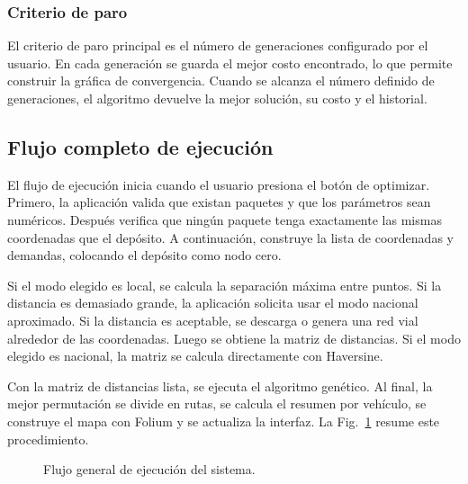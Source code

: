 \documentclass[runningheads]{llncs}
\begin{document}
\subsubsection{Criterio de paro}
El criterio de paro principal es el n\'umero de generaciones configurado por el
usuario. En cada generaci\'on se guarda el mejor costo encontrado, lo que permite
construir la gr\'afica de convergencia. Cuando se alcanza el n\'umero definido de
generaciones, el algoritmo devuelve la mejor soluci\'on, su costo y el historial.

\subsection{Flujo completo de ejecuci\'on}

El flujo de ejecuci\'on inicia cuando el usuario presiona el bot\'on de optimizar.
Primero, la aplicaci\'on valida que existan paquetes y que los par\'ametros sean
num\'ericos. Despu\'es verifica que ning\'un paquete tenga exactamente las mismas
coordenadas que el dep\'osito. A continuaci\'on, construye la lista de coordenadas
y demandas, colocando el dep\'osito como nodo cero.

Si el modo elegido es local, se calcula la separaci\'on m\'axima entre puntos. Si
la distancia es demasiado grande, la aplicaci\'on solicita usar el modo nacional
aproximado. Si la distancia es aceptable, se descarga o genera una red vial
alrededor de las coordenadas. Luego se obtiene la matriz de distancias. Si el
modo elegido es nacional, la matriz se calcula directamente con Haversine.

Con la matriz de distancias lista, se ejecuta el algoritmo gen\'etico. Al final,
la mejor permutaci\'on se divide en rutas, se calcula el resumen por veh\'iculo, se
construye el mapa con Folium y se actualiza la interfaz. La Fig.~\ref{fig:flujo}
resume este procedimiento.

\begin{figure}
\centering
{}
\caption{Flujo general de ejecuci\'on del sistema.}
\label{fig:flujo}
\end{figure}
\end{document}
